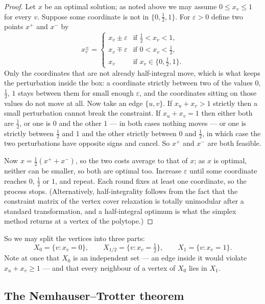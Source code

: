 \begin{proof}
Let $x$ be an optimal solution; as noted above we may assume
$0 \le x_v \le 1$ for every $v$. Suppose some coordinate is not in
$\{0,\frac12,1\}$. For $\varepsilon > 0$ define two points $x^{+}$ and $x^{-}$
by
\[ x^{\pm}_v = \begin{cases}
     x_v \pm \varepsilon & \text{if } \tfrac12 < x_v < 1, \\
     x_v \mp \varepsilon & \text{if } 0 < x_v < \tfrac12, \\
     x_v & \text{if } x_v \in \{0, \tfrac12, 1\}.
   \end{cases} \]
Only the coordinates that are not already half-integral move, which is what
keeps the perturbation inside the box: a coordinate strictly between two of the
values $0$, $\frac12$, $1$ stays between them for small enough $\varepsilon$,
and the coordinates sitting on those values do not move at all. Now take an
edge $\{u,v\}$. If $x_u + x_v > 1$ strictly then a small perturbation cannot
break the constraint. If $x_u + x_v = 1$ then either both are $\frac12$, or one
is $0$ and the other $1$ --- in both cases nothing moves --- or one is strictly
between $\frac12$ and $1$ and the other strictly between $0$ and $\frac12$, in
which case the two perturbations have opposite signs and cancel. So $x^{+}$ and
$x^{-}$ are both feasible.

Now $x = \frac12(x^{+} + x^{-})$, so the two costs average to that of $x$; as
$x$ is optimal, neither can be smaller, so both are optimal too. Increase
$\varepsilon$ until some coordinate reaches $0$, $\frac12$ or $1$, and repeat.
Each round fixes at least one coordinate, so the process stops. (Alternatively,
half-integrality follows from the fact that the constraint matrix of the vertex
cover relaxation is totally unimodular after a standard transformation, and a
half-integral optimum is what the simplex method returns at a vertex of the
polytope.)
\end{proof}

So we may split the vertices into three parts:
\[ X_0 = \{v : x_v = 0\}, \qquad
   X_{1/2} = \{v : x_v = \tfrac12\}, \qquad
   X_1 = \{v : x_v = 1\}. \]
Note at once that $X_0$ is an independent set --- an edge inside it would
violate $x_u + x_v \ge 1$ --- and that every neighbour of a vertex of $X_0$ lies
in $X_1$.

\subsection{The Nemhauser--Trotter theorem}

